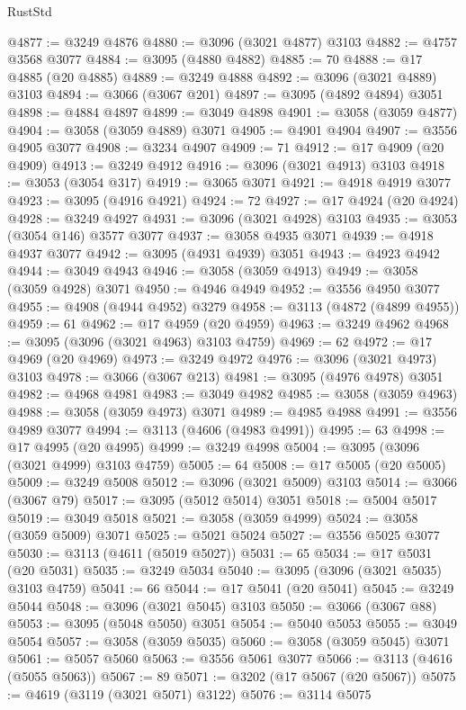 \begin{lexlean}{RustStd}
\begin{coremodule}
@4877 := @3249 @4876
@4880 := @3096 (@3021 @4877) @3103
@4882 := @4757 @3568 @3077
@4884 := @3095 (@4880 @4882)
@4885 := 70
@4888 := @17 @4885 (@20 @4885)
@4889 := @3249 @4888
@4892 := @3096 (@3021 @4889) @3103
@4894 := @3066 (@3067 @201)
@4897 := @3095 (@4892 @4894) @3051
@4898 := @4884 @4897
@4899 := @3049 @4898
@4901 := @3058 (@3059 @4877)
@4904 := @3058 (@3059 @4889) @3071
@4905 := @4901 @4904
@4907 := @3556 @4905 @3077
@4908 := @3234 @4907
@4909 := 71
@4912 := @17 @4909 (@20 @4909)
@4913 := @3249 @4912
@4916 := @3096 (@3021 @4913) @3103
@4918 := @3053 (@3054 @317)
@4919 := @3065 @3071
@4921 := @4918 @4919 @3077
@4923 := @3095 (@4916 @4921)
@4924 := 72
@4927 := @17 @4924 (@20 @4924)
@4928 := @3249 @4927
@4931 := @3096 (@3021 @4928) @3103
@4935 := @3053 (@3054 @146) @3577 @3077
@4937 := @3058 @4935 @3071
@4939 := @4918 @4937 @3077
@4942 := @3095 (@4931 @4939) @3051
@4943 := @4923 @4942
@4944 := @3049 @4943
@4946 := @3058 (@3059 @4913)
@4949 := @3058 (@3059 @4928) @3071
@4950 := @4946 @4949
@4952 := @3556 @4950 @3077
@4955 := @4908 (@4944 @4952) @3279
@4958 := @3113 (@4872 (@4899 @4955))
@4959 := 61
@4962 := @17 @4959 (@20 @4959)
@4963 := @3249 @4962
@4968 := @3095 (@3096 (@3021 @4963) @3103 @4759)
@4969 := 62
@4972 := @17 @4969 (@20 @4969)
@4973 := @3249 @4972
@4976 := @3096 (@3021 @4973) @3103
@4978 := @3066 (@3067 @213)
@4981 := @3095 (@4976 @4978) @3051
@4982 := @4968 @4981
@4983 := @3049 @4982
@4985 := @3058 (@3059 @4963)
@4988 := @3058 (@3059 @4973) @3071
@4989 := @4985 @4988
@4991 := @3556 @4989 @3077
@4994 := @3113 (@4606 (@4983 @4991))
@4995 := 63
@4998 := @17 @4995 (@20 @4995)
@4999 := @3249 @4998
@5004 := @3095 (@3096 (@3021 @4999) @3103 @4759)
@5005 := 64
@5008 := @17 @5005 (@20 @5005)
@5009 := @3249 @5008
@5012 := @3096 (@3021 @5009) @3103
@5014 := @3066 (@3067 @79)
@5017 := @3095 (@5012 @5014) @3051
@5018 := @5004 @5017
@5019 := @3049 @5018
@5021 := @3058 (@3059 @4999)
@5024 := @3058 (@3059 @5009) @3071
@5025 := @5021 @5024
@5027 := @3556 @5025 @3077
@5030 := @3113 (@4611 (@5019 @5027))
@5031 := 65
@5034 := @17 @5031 (@20 @5031)
@5035 := @3249 @5034
@5040 := @3095 (@3096 (@3021 @5035) @3103 @4759)
@5041 := 66
@5044 := @17 @5041 (@20 @5041)
@5045 := @3249 @5044
@5048 := @3096 (@3021 @5045) @3103
@5050 := @3066 (@3067 @88)
@5053 := @3095 (@5048 @5050) @3051
@5054 := @5040 @5053
@5055 := @3049 @5054
@5057 := @3058 (@3059 @5035)
@5060 := @3058 (@3059 @5045) @3071
@5061 := @5057 @5060
@5063 := @3556 @5061 @3077
@5066 := @3113 (@4616 (@5055 @5063))
@5067 := 89
@5071 := @3202 (@17 @5067 (@20 @5067))
@5075 := @4619 (@3119 (@3021 @5071) @3122)
@5076 := @3114 @5075

\end{coremodule}
\end{lexlean}
